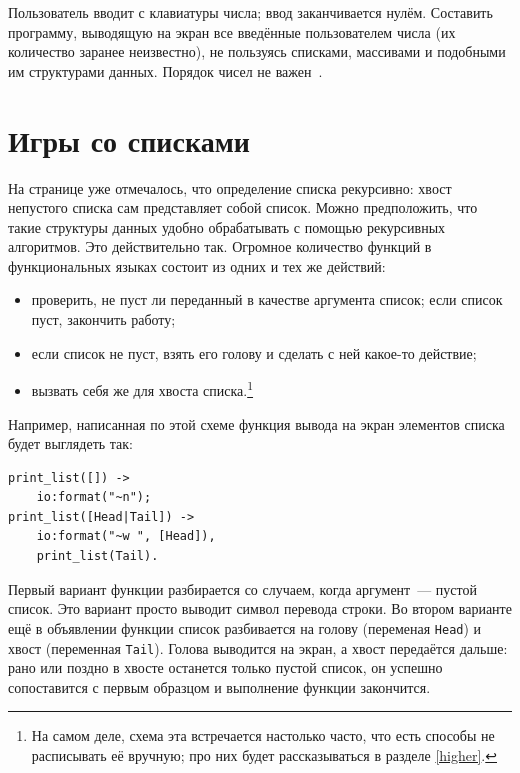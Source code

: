 \documentclass[
  paper=a4,
  fontsize=14pt,
  openany,
  appendixprefix=true
]{scrbook}
\begin{document}
\begin{problem}\label{number_sequence}
\complicated Пользователь вводит с клавиатуры числа; ввод заканчивается нулём. Составить программу, выводящую на экран все введённые пользователем числа (их количество заранее неизвестно), не пользуясь списками, массивами и подобными им структурами данных. Порядок чисел не важен~\cite[10.3]{zlatopolsky}.
\end{problem}

\section{Игры со списками}
\label{listgames}

На странице \pageref{listdef} уже отмечалось, что определение списка рекурсивно: хвост непустого списка сам представляет собой список. Можно предположить, что такие структуры данных удобно обрабатывать с помощью рекурсивных алгоритмов. Это действительно так. Огромное количество функций в функциональных языках состоит из одних и тех же действий:
\begin{itemize}
\item проверить, не пуст ли переданный в качестве аргумента список; если список пуст, закончить работу;
\item если список не пуст, взять его голову и сделать с ней какое-то действие;
\item вызвать себя же для хвоста списка.\footnote{На самом деле, схема эта встречается настолько часто, что есть способы не расписывать её вручную; про них будет рассказываться в разделе \ref{higher}.}
\end{itemize}

Например, написанная по этой схеме функция вывода на экран элементов списка будет выглядеть так:
\begin{lstlisting}
print_list([]) ->
    io:format("~n");
print_list([Head|Tail]) ->
    io:format("~w ", [Head]),
    print_list(Tail).
\end{lstlisting}

Первый вариант функции разбирается со случаем, когда аргумент~--- пустой список. Это вариант просто выводит символ перевода строки. Во втором варианте ещё в объявлении функции список разбивается на голову (переменая \lstinline{Head}) и хвост (переменная \lstinline{Tail}). Голова выводится на экран, а хвост передаётся дальше: рано или поздно в хвосте останется только пустой список, он успешно сопоставится с первым образцом и выполнение функции закончится.
\end{document}
